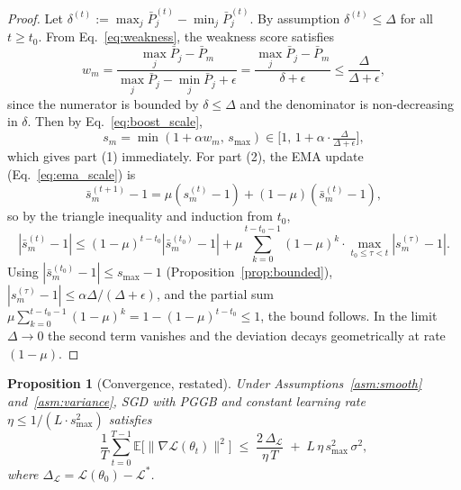 \documentclass{article}
\newtheorem{proposition}{Proposition}
\newcommand{\loss}{\mathcal{L}}
\begin{document}
\begin{proof}
Let $\delta^{(t)} := \max_j \bar{P}_j^{(t)} - \min_j \bar{P}_j^{(t)}$. By assumption $\delta^{(t)} \leq \Delta$ for all $t \geq t_0$. From Eq.~\eqref{eq:weakness}, the weakness score satisfies
\begin{equation*}
w_m = \frac{\max_j \bar{P}_j - \bar{P}_m}{\max_j \bar{P}_j - \min_j \bar{P}_j + \epsilon} = \frac{\max_j \bar{P}_j - \bar{P}_m}{\delta + \epsilon} \leq \frac{\Delta}{\Delta + \epsilon},
\end{equation*}
since the numerator is bounded by $\delta \leq \Delta$ and the denominator is non-decreasing in $\delta$. Then by Eq.~\eqref{eq:boost_scale},
\begin{equation*}
s_m = \min(1 + \alpha w_m,\, s_{\max}) \in \bigl[1,\, 1 + \alpha \cdot \tfrac{\Delta}{\Delta + \epsilon}\bigr],
\end{equation*}
which gives part (1) immediately. For part (2), the EMA update (Eq.~\eqref{eq:ema_scale}) is
\begin{equation*}
\bar{s}_m^{(t+1)} - 1 = \mu (s_m^{(t)} - 1) + (1 - \mu)(\bar{s}_m^{(t)} - 1),
\end{equation*}
so by the triangle inequality and induction from $t_0$,
\begin{equation*}
|\bar{s}_m^{(t)} - 1| \leq (1-\mu)^{t - t_0} |\bar{s}_m^{(t_0)} - 1| + \mu \sum_{k=0}^{t - t_0 - 1} (1-\mu)^k \cdot \max_{t_0 \leq \tau < t} |s_m^{(\tau)} - 1|.
\end{equation*}
Using $|\bar{s}_m^{(t_0)} - 1| \leq s_{\max} - 1$ (Proposition~\ref{prop:bounded}), $|s_m^{(\tau)} - 1| \leq \alpha \Delta / (\Delta + \epsilon)$, and the partial sum $\mu \sum_{k=0}^{t-t_0-1} (1-\mu)^{k} = 1 - (1-\mu)^{t-t_0} \leq 1$, the bound follows. In the limit $\Delta \to 0$ the second term vanishes and the deviation decays geometrically at rate $(1-\mu)$.
\end{proof}


\begin{proposition}[Convergence, restated]
Under Assumptions~\ref{asm:smooth} and~\ref{asm:variance}, SGD with PGGB and constant learning rate $\eta \leq 1/(L \cdot s_{\max}^2)$ satisfies
%
\begin{equation*}
\frac{1}{T}\sum_{t=0}^{T-1} \mathbb{E}\bigl[\|\nabla \loss(\theta_t)\|^2\bigr]
\;\leq\; \frac{2\,\Delta_{\loss}}{\eta\, T} \;+\; L\,\eta\, s_{\max}^2\, \sigma^2,
\end{equation*}
%
where $\Delta_{\loss} = \loss(\theta_0) - \loss^{*}$.
\end{proposition}
\end{document}
